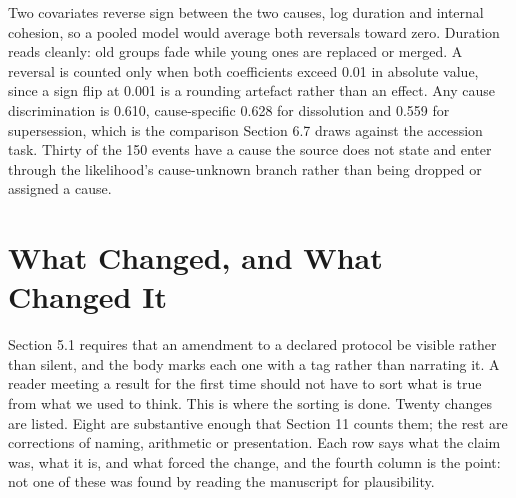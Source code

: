 \documentclass[twoside,11pt]{article}
\begin{document}
Two covariates reverse sign between the two causes, log duration and internal cohesion, so a pooled model would average both reversals toward zero. Duration reads cleanly: old groups fade while young ones are replaced or merged. A reversal is counted only when both coefficients exceed 0.01 in absolute value, since a sign flip at 0.001 is a rounding artefact rather than an effect. Any cause discrimination is 0.610, cause-specific 0.628 for dissolution and 0.559 for supersession, which is the comparison Section 6.7 draws against the accession task. Thirty of the 150 events have a cause the source does not state and enter through the likelihood's cause-unknown branch rather than being dropped or assigned a cause.

\section{What Changed, and What Changed It}
\label{app:B}

Section 5.1 requires that an amendment to a declared protocol be visible rather than silent, and the body marks each one with a tag rather than narrating it. A reader meeting a result for the first time should not have to sort what is true from what we used to think. This is where the sorting is done. Twenty changes are listed. Eight are substantive enough that Section 11 counts them; the rest are corrections of naming, arithmetic or presentation. Each row says what the claim was, what it is, and what forced the change, and the fourth column is the point: not one of these was found by reading the manuscript for plausibility.
\end{document}
